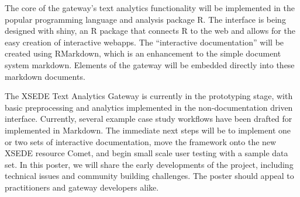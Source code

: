 \documentclass[11pt, a4paper]{article}
\begin{document}
The core of the gateway’s text analytics functionality will be implemented in 
the popular programming language and analysis package R.  The interface is 
being designed with shiny, an R package that connects R to the web and 
allows for the easy creation of interactive webapps.  The ``interactive 
documentation'' will be created using RMarkdown, which is an enhancement to the 
simple document system markdown.  Elements of the gateway will be embedded 
directly into these markdown documents.

The XSEDE Text Analytics Gateway is currently in the prototyping stage, with 
basic preprocessing and analytics implemented in the non-documentation driven 
interface. Currently, several example case study workflows have been drafted for 
implemented in Markdown. The immediate next steps will be to implement one or 
two sets of interactive documentation, move the framework onto the new XSEDE 
resource Comet, and begin small scale user testing with a sample data set.  In 
this poster, we will share the early developments of the project, including 
technical issues and community building challenges.  The poster should appeal to 
practitioners and gateway developers alike.



\nocite{shiny,rlang, rmd}


\end{document}
